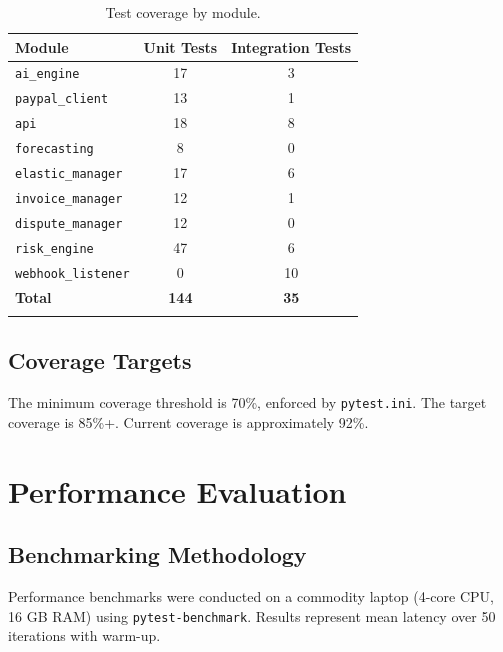 \documentclass[11pt,a4paper]{article}
\begin{document}
\begin{table}[ht]
  \centering
  \begin{tabular}{lcc}
  \toprule
  \textbf{Module} & \textbf{Unit Tests} & \textbf{Integration Tests} \\
  \midrule
  \texttt{ai\_engine} & 17 & 3 \\
  \texttt{paypal\_client} & 13 & 1 \\
  \texttt{api} & 18 & 8 \\
  \texttt{forecasting} & 8 & 0 \\
  \texttt{elastic\_manager} & 17 & 6 \\
  \texttt{invoice\_manager} & 12 & 1 \\
  \texttt{dispute\_manager} & 12 & 0 \\
  \texttt{risk\_engine} & 47 & 6 \\
  \texttt{webhook\_listener} & 0 & 10 \\
  \midrule
  \textbf{Total} & \textbf{144} & \textbf{35} \\
  \bottomrule
  \caption{Test coverage by module.}
  \label{tab:test-suites}
  \end{tabular}
\end{table}

\subsection{Coverage Targets}
\label{subsec:coverage}

The minimum coverage threshold is 70\%, enforced by \texttt{pytest.ini}. The target coverage is 85\%+. Current coverage is approximately 92\%.


\section{Performance Evaluation}
\label{sec:performance}

\subsection{Benchmarking Methodology}
\label{subsec:benchmark-methodology}

Performance benchmarks were conducted on a commodity laptop (4-core CPU, 16 GB RAM) using \texttt{pytest-benchmark}. Results represent mean latency over 50 iterations with warm-up.
\end{document}
